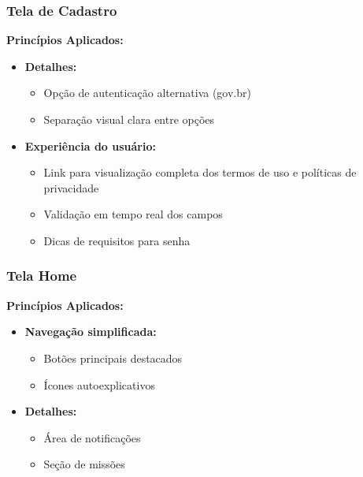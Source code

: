 \documentclass[a5paper, 12pt]{article}
\begin{document}
\subsubsection{Tela de Cadastro}
\textbf{Princípios Aplicados:}
\begin{itemize}[leftmargin=*]  
    \item \textbf{Detalhes:}
    \begin{itemize}
        \item Opção de autenticação alternativa (gov.br)
        \item Separação visual clara entre opções
    \end{itemize}

    \item \textbf{Experiência do usuário:}
    \begin{itemize}
        \item Link para visualização completa dos termos de uso e políticas de privacidade
        \item Validação em tempo real dos campos
        \item Dicas de requisitos para senha
    \end{itemize}
\end{itemize}

\subsubsection{Tela Home}
\textbf{Princípios Aplicados:}
\begin{itemize}[leftmargin=*]
    \item \textbf{Navegação simplificada:}
    \begin{itemize}
        \item Botões principais destacados
        \item Ícones autoexplicativos
    \end{itemize}

    \item \textbf{Detalhes:}
    \begin{itemize}
        \item Área de notificações
        \item Seção de missões
    \end{itemize}
\end{itemize}
\end{document}
